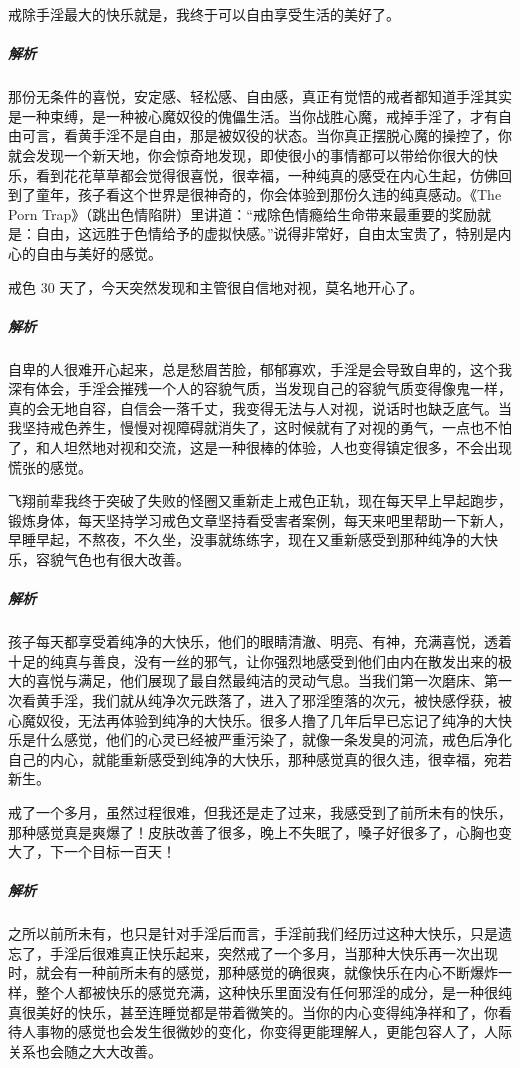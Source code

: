 \begin{case}[那份弥足珍贵的自由感]
    戒除手淫最大的快乐就是，我终于可以自由享受生活的美好了。
    \subparagraph{解析} 那份无条件的喜悦，安定感、轻松感、自由感，真正有觉悟的戒者都知道手淫其实是一种束缚，是一种被心魔奴役的傀儡生活。当你战胜心魔，戒掉手淫了，才有自由可言，看黄手淫不是自由，那是被奴役的状态。当你真正摆脱心魔的操控了，你就会发现一个新天地，你会惊奇地发现，即使很小的事情都可以带给你很大的快乐，看到花花草草都会觉得很喜悦，很幸福，一种纯真的感受在内心生起，仿佛回到了童年，孩子看这个世界是很神奇的，你会体验到那份久违的纯真感动。《The Porn Trap》（跳出色情陷阱）里讲道：“戒除色情瘾给生命带来最重要的奖励就是：自由，这远胜于色情给予的虚拟快感。”说得非常好，自由太宝贵了，特别是内心的自由与美好的感觉。
\end{case}

\begin{case}[由自信带来的快乐]
    戒色 30 天了，今天突然发现和主管很自信地对视，莫名地开心了。
    \subparagraph{解析} 自卑的人很难开心起来，总是愁眉苦脸，郁郁寡欢，手淫是会导致自卑的，这个我深有体会，手淫会摧残一个人的容貌气质，当发现自己的容貌气质变得像鬼一样，真的会无地自容，自信会一落千丈，我变得无法与人对视，说话时也缺乏底气。当我坚持戒色养生，慢慢对视障碍就消失了，这时候就有了对视的勇气，一点也不怕了，和人坦然地对视和交流，这是一种很棒的体验，人也变得镇定很多，不会出现慌张的感觉。
\end{case}

\begin{case}[纯净的大快乐]
    飞翔前辈我终于突破了失败的怪圈又重新走上戒色正轨，现在每天早上早起跑步，锻炼身体，每天坚持学习戒色文章坚持看受害者案例，每天来吧里帮助一下新人，早睡早起，不熬夜，不久坐，没事就练练字，现在又重新感受到那种纯净的大快乐，容貌气色也有很大改善。
    \subparagraph{解析} 孩子每天都享受着纯净的大快乐，他们的眼睛清澈、明亮、有神，充满喜悦，透着十足的纯真与善良，没有一丝的邪气，让你强烈地感受到他们由内在散发出来的极大的喜悦与满足，他们展现了最自然最纯洁的灵动气息。当我们第一次磨床、第一次看黄手淫，我们就从纯净次元跌落了，进入了邪淫堕落的次元，被快感俘获，被心魔奴役，无法再体验到纯净的大快乐。很多人撸了几年后早已忘记了纯净的大快乐是什么感觉，他们的心灵已经被严重污染了，就像一条发臭的河流，戒色后净化自己的内心，就能重新感受到纯净的大快乐，那种感觉真的很久违，很幸福，宛若新生。
\end{case}

\begin{case}[前所未有的快乐]
    戒了一个多月，虽然过程很难，但我还是走了过来，我感受到了前所未有的快乐，那种感觉真是爽爆了！皮肤改善了很多，晚上不失眠了，嗓子好很多了，心胸也变大了，下一个目标一百天！
    \subparagraph{解析} 之所以前所未有，也只是针对手淫后而言，手淫前我们经历过这种大快乐，只是遗忘了，手淫后很难真正快乐起来，突然戒了一个多月，当那种大快乐再一次出现时，就会有一种前所未有的感觉，那种感觉的确很爽，就像快乐在内心不断爆炸一样，整个人都被快乐的感觉充满，这种快乐里面没有任何邪淫的成分，是一种很纯真很美好的快乐，甚至连睡觉都是带着微笑的。当你的内心变得纯净祥和了，你看待人事物的感觉也会发生很微妙的变化，你变得更能理解人，更能包容人了，人际关系也会随之大大改善。
\end{case}

